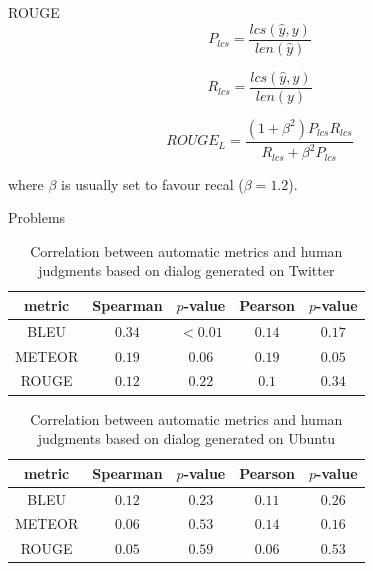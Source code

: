 \documentclass[10pt]{beamer}
\begin{document}
\begin{frame}{ROUGE}
\begin{equation}
P_{lcs} = \frac{lcs(\hat{y}, y)}{len(\hat{y})}
\end{equation}    


\begin{equation}
R_{lcs} = \frac{lcs(\hat{y}, y)}{len(y)}
\end{equation}

\begin{equation}
ROUGE_L = \frac{(1 + \beta^2) P_{lcs} R_{lcs}}{R_{lcs} + \beta^{2}P_{lcs}}
\end{equation}

where $\beta$ is usually set to favour recal ($\beta = 1.2$).
\end{frame}


\begin{frame}{Problems \cite{LiuLSNCP16}}

\begin{table}[h]
\centering
\label{hownottable}
\begin{tabular}{|c|c|c|c|c|}
\hline
\cellcolor{blue!50} metric & \cellcolor{blue!50} Spearman & \cellcolor{blue!50} $p$-value & \cellcolor{blue!50} Pearson &  \cellcolor{blue!50} $p$-value \\ \hline
BLEU   & $0.34$   & $< 0.01$  & $0.14$  & $0.17$ \\ \hline
METEOR & $0.19$   & $0.06$    & $0.19$  & $0.05$ \\ \hline
ROUGE  & $0.12$   & $0.22$    & $0.1$   & $0.34$ \\ \hline  
\end{tabular}
\caption{Correlation between automatic metrics and human judgments based on dialog generated on Twitter}
\end{table}

\begin{table}[h]
\centering
\label{hownottable}
\begin{tabular}{|c|c|c|c|c|}
\hline
\cellcolor{blue!50} metric & \cellcolor{blue!50} Spearman & \cellcolor{blue!50} $p$-value & \cellcolor{blue!50} Pearson &  \cellcolor{blue!50} $p$-value \\ \hline
BLEU & $0.12$   & $0.23$    & $0.11$  & $0.26$    \\ \hline
METEOR & $0.06$   & $0.53$    & $0.14$  & $0.16$     \\ \hline
ROUGE & $0.05$   & $0.59$    & $0.06$  & $0.53$    \\ \hline
\end{tabular}
\caption{Correlation between automatic metrics and human judgments based on dialog generated on Ubuntu}
\end{table}
\end{frame}
\end{document}
